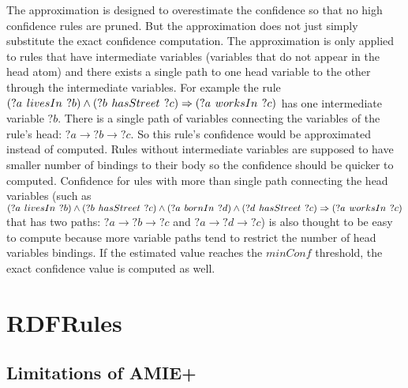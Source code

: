 The approximation is designed to overestimate the confidence so that no high confidence rules are pruned. But the approximation does not just simply substitute the exact confidence computation. The approximation is only applied to rules that have intermediate variables (variables that do not appear in the head atom) and there exists a single path to one head variable to the other through the intermediate variables. For example the rule $(?a\hspace{0.4em}livesIn\hspace{0.4em}?b) \land (?b\hspace{0.4em}hasStreet\hspace{0.4em}?c) \Rightarrow (?a\hspace{0.4em}worksIn\hspace{0.4em}?c)$ has one intermediate variable $?b$. There is a single path of variables connecting the variables of the rule's head: $?a \rightarrow ?b \rightarrow ?c$. So this rule's confidence would be approximated instead of computed. Rules without intermediate variables are supposed to have smaller number of bindings to their body so the confidence should be quicker to computed. Confidence for ules with more than single path connecting the head variables (such as $(?a\hspace{0.4em}livesIn\hspace{0.4em}?b) \land (?b\hspace{0.4em}hasStreet\hspace{0.4em}?c) \land (?a\hspace{0.4em}bornIn\hspace{0.4em}?d) \land (?d\hspace{0.4em}hasStreet\hspace{0.4em}?c)\Rightarrow (?a\hspace{0.4em}worksIn\hspace{0.4em}?c)$ that has two paths: $?a \rightarrow ?b \rightarrow ?c$ and $?a \rightarrow ?d \rightarrow ?c$) is also thought to be easy to compute because more variable paths tend to restrict the number of head variables bindings. If the estimated value reaches the $minConf$ threshold, the exact confidence value is computed as well.

\section{RDFRules}

\subsection{Limitations of AMIE+}

